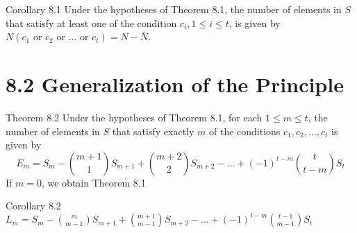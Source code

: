 \documentclass[a4paper]{article}
\begin{document}
\color{green}Corollary 8.1 \color{black} Under the hypotheses of Theorem 8.1, the number of elements in $S$ that satisfy at least one of the condition $c_i,1\leq i\leq t$, is given by $N(c_1\text{ or }c_2\text{ or }\dots\text{ or } c_t)=N-\bar{N}$.

\section*{8.2 Generalization of the Principle}
\color{green}Theorem 8.2 \color{black} Under the hypotheses of Theorem 8.1, for each $1\leq m\leq t$, the number of elements in $S$ that satisfy exactly $m$ of the conditions $c_1, c_2, \dots, c_t$ is given by
$$
E_m=S_m-\binom{m+1}{1}S_{m+1}+\binom{m+2}{2}S_{m+2}-\dots +(-1)^{t-m}\binom{t}{t-m}S_t
$$
If $m=0$, we obtain Theorem 8.1

\color{green}Corollary 8.2 \color{black} $L_m=S_m-\binom{m}{m-1}S_{m+1}+\binom{m+1}{m-1}S_{m+2}-\dots +(-1)^{t-m}\binom{t-1}{m-1}S_t$
\end{document}
